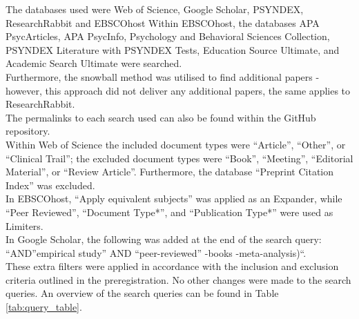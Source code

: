 \documentclass[
  stu,floatsintext]{apa7}
\begin{document}
The databases used were Web of Science, Google Scholar, PSYNDEX, ResearchRabbit and EBSCOhost Within EBSCOhost, the databases APA PsycArticles, APA PsycInfo, Psychology and Behavioral Sciences Collection, PSYNDEX Literature with PSYNDEX Tests, Education Source Ultimate, and Academic Search Ultimate were searched.\\
Furthermore, the snowball method was utilised to find additional papers - however, this approach did not deliver any additional papers, the same applies to ResearchRabbit.\\
The permalinks to each search used can also be found within the GitHub repository.\\
Within Web of Science the included document types were ``Article'', ``Other'', or ``Clinical Trail''; the excluded document types were ``Book'', ``Meeting'', ``Editorial Material'', or ``Review Article''.
Furthermore, the database ``Preprint Citation Index'' was excluded.\\
In EBSCOhost, ``Apply equivalent subjects'' was applied as an Expander, while ``Peer Reviewed'', ``Document Type*'', and ``Publication Type*'' were used as Limiters.\\
In Google Scholar, the following was added at the end of the search query: ``AND''empirical study'' AND ``peer-reviewed'' -books -meta-analysis)``.\\
These extra filters were applied in accordance with the inclusion and exclusion criteria outlined in the preregistration. No other changes were made to the search queries. An overview of the search queries can be found in Table \ref{tab:query_table}.
\end{document}

